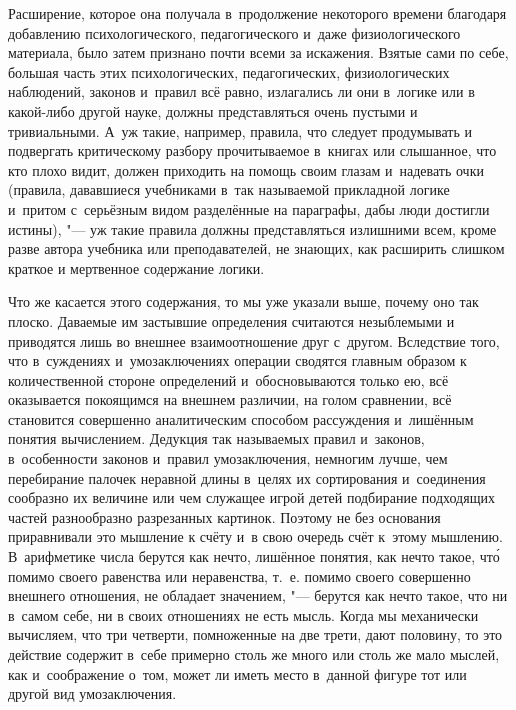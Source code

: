 Расширение, которое она получала в~продолжение некоторого времени благодаря
добавлению психологического, педагогического и~даже физиологического
материала, было затем признано почти всеми за искажения. Взятые сами по
себе, большая часть этих психологических, педагогических, физиологических
наблюдений, законов и~правил всё равно, излагались ли они в~логике или в
какой-либо другой науке, должны представляться очень пустыми и
тривиальными. А~уж такие, например, правила, что следует продумывать и
подвергать критическому разбору прочитываемое в~книгах или слышанное, что
кто плохо видит, должен приходить на помощь своим глазам и~надевать очки
(правила, дававшиеся учебниками в~так называемой прикладной логике и~притом
с~серьёзным видом разделённые на параграфы, дабы люди достигли истины), "---
уж такие правила должны представляться излишними всем, кроме разве автора
учебника или преподавателей, не знающих, как расширить слишком краткое и
мертвенное содержание логики.

Что же касается этого содержания, то мы уже указали выше, почему оно так
плоско. Даваемые им застывшие определения считаются незыблемыми и
приводятся лишь во внешнее взаимоотношение друг с~другом. Вследствие того,
что в~суждениях и~умозаключениях операции сводятся главным образом к
количественной стороне определений и~обосновываются только ею, всё
оказывается покоящимся на внешнем различии, на голом сравнении, всё
становится совершенно аналитическим способом рассуждения и~лишённым понятия
вычислением. Дедукция так называемых правил и~законов, в~особенности
законов и~правил умозаключения, немногим лучше, чем перебирание палочек
неравной длины в~целях их сортирования и~соединения сообразно их величине
или чем служащее игрой детей подбирание подходящих частей разнообразно
разрезанных картинок. Поэтому не без основания приравнивали это мышление к
счёту и~в свою очередь счёт к~этому мышлению. В~арифметике числа берутся
как нечто, лишённое понятия, как нечто такое, чт\'{о} помимо своего равенства
или неравенства, т.~е. помимо своего совершенно внешнего отношения, не
обладает значением, "--- берутся как нечто такое, что ни в~самом себе, ни в
своих отношениях не есть мысль. Когда мы механически вычисляем, что три
четверти, помноженные на две трети, дают половину, то это действие содержит
в~себе примерно столь же много или столь же мало мыслей, как и~соображение
о~том, может ли иметь место в~данной фигуре тот или другой вид умозаключения.

